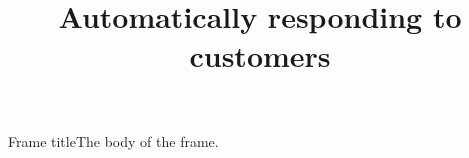 \documentclass[pdf]{beamer}
\title{Automatically responding to customers}
\begin{document}
\begin{frame}
  \titlepage
\end{frame}%
\begin{frame}{Frame title}The body of the frame.
\end{frame}
\end{document}
